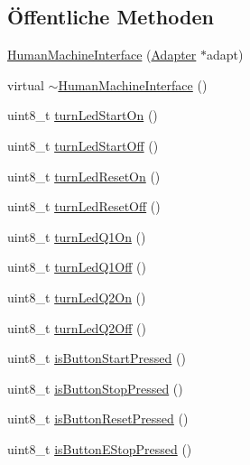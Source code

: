 \subsection*{Öffentliche Methoden}
\begin{DoxyCompactItemize}
\item 
\hyperlink{class_human_machine_interface_aee37229a726c66857601422ba1605ac6}{Human\+Machine\+Interface} (\hyperlink{class_adapter}{Adapter} $\ast$adapt)
\item 
virtual \hyperlink{class_human_machine_interface_a2ac7ae9e7e6be379da946eac459ea243}{$\sim$\+Human\+Machine\+Interface} ()
\item 
uint8\+\_\+t \hyperlink{class_human_machine_interface_a46dca7b3435dc4b20a2db67b301cb36d}{turn\+Led\+Start\+On} ()
\item 
uint8\+\_\+t \hyperlink{class_human_machine_interface_a235557e9ae72f14a4db72bab675eaae1}{turn\+Led\+Start\+Off} ()
\item 
uint8\+\_\+t \hyperlink{class_human_machine_interface_aecc34d7d1e3edbe2ed38e3808da65455}{turn\+Led\+Reset\+On} ()
\item 
uint8\+\_\+t \hyperlink{class_human_machine_interface_a446ad469f8c9f2717d12cc69ea68598f}{turn\+Led\+Reset\+Off} ()
\item 
uint8\+\_\+t \hyperlink{class_human_machine_interface_a0ba867b5493f024f53c1e00a1287aa6c}{turn\+Led\+Q1\+On} ()
\item 
uint8\+\_\+t \hyperlink{class_human_machine_interface_a7d696c1803928a001bb98585f2ceb138}{turn\+Led\+Q1\+Off} ()
\item 
uint8\+\_\+t \hyperlink{class_human_machine_interface_a9fcfd97db711e6954cbfeec8f93efb58}{turn\+Led\+Q2\+On} ()
\item 
uint8\+\_\+t \hyperlink{class_human_machine_interface_a73d76c6dd54b115fa8df9cf5f2b0d2aa}{turn\+Led\+Q2\+Off} ()
\item 
uint8\+\_\+t \hyperlink{class_human_machine_interface_a4926796f1c1411f975e2da96c68079dd}{is\+Button\+Start\+Pressed} ()
\item 
uint8\+\_\+t \hyperlink{class_human_machine_interface_a6b150a5a2978b620a3823aaeda7e80b8}{is\+Button\+Stop\+Pressed} ()
\item 
uint8\+\_\+t \hyperlink{class_human_machine_interface_ab78f8bd8db3e0b150699416d8081ee98}{is\+Button\+Reset\+Pressed} ()
\item 
uint8\+\_\+t \hyperlink{class_human_machine_interface_ad9844e21fd01872ad78afb9e16acc59f}{is\+Button\+E\+Stop\+Pressed} ()
\end{DoxyCompactItemize}



